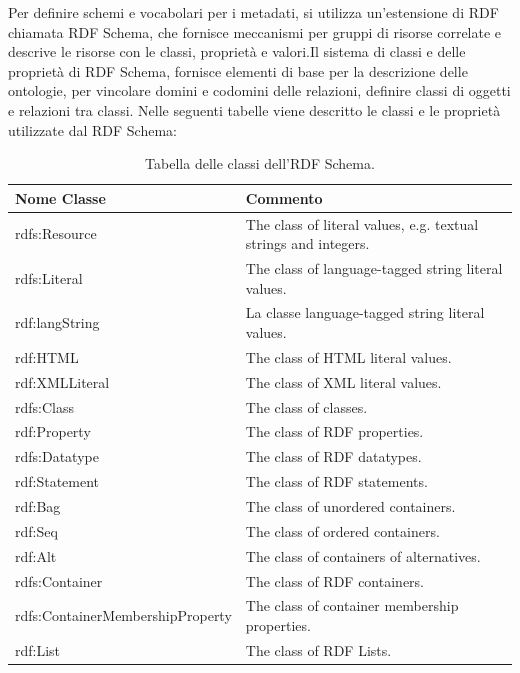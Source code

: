 \documentclass[a4paper,11pt]{article}
\begin{document}
Per definire schemi e vocabolari per i metadati, si utilizza un'estensione di RDF chiamata RDF Schema, che fornisce meccanismi per gruppi di risorse correlate e descrive le risorse con le classi, proprietà e valori.\newline Il sistema di classi e delle proprietà di RDF Schema, fornisce elementi di base per la descrizione delle ontologie, per vincolare domini e codomini delle relazioni, definire classi di oggetti e relazioni tra classi.
Nelle seguenti tabelle viene descritto le classi e le proprietà utilizzate dal RDF Schema:	\newline		
\begin{table}[!htb]
\begin{center}				
\begin{tabular}{|>{\small}l|>{\small}l|}
	\hline
	\textbf{Nome Classe} & \textbf{Commento}\\				
	\hline 	rdfs:Resource & The class of literal values, e.g. textual strings and integers.\\	
	\hline rdfs:Literal & 	The class of language-tagged string literal values.\\ 			\hline rdf:langString & La classe  language-tagged string literal values.\\			\hline rdf:HTML &	The class of HTML literal values.\\
	\hline rdf:XMLLiteral	& The class of XML literal values.\\
	\hline rdfs:Class & The class of classes.\\
	\hline rdf:Property & The class of RDF properties.\\
	\hline rdfs:Datatype &	The class of RDF datatypes.\\
	\hline rdf:Statement & The class of RDF statements.\\
	\hline rdf:Bag	& The class of unordered containers.\\
	\hline rdf:Seq	& The class of ordered containers.\\
	\hline rdf:Alt	& The class of containers of alternatives.\\
	\hline rdfs:Container & The class of RDF containers.\\
	\hline rdfs:ContainerMembershipProperty & The class of container membership properties.\\
	\hline rdf:List &	The class of RDF Lists.\\
	\hline			
\end{tabular}	
\caption{Tabella delle classi dell'RDF Schema.}	
\end{center}	
\end{table}
\end{document}
